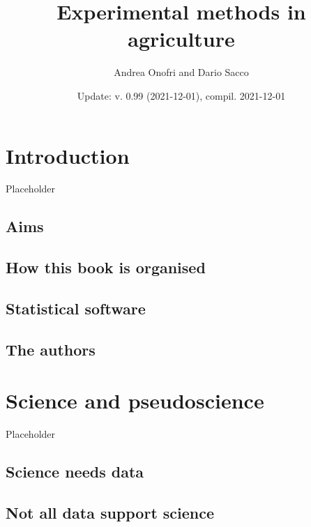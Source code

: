 \documentclass[a4paper,12pt,oneside]{book}
\author{Andrea Onofri and Dario Sacco}
\date{Update: v. 0.99 (2021-12-01), compil. 2021-12-01}
\title{Experimental methods in agriculture}
\subtitle{}
\begin{document}
\maketitle
\tableofcontents

\hypertarget{introduction}{%
\chapter*{Introduction}\label{introduction}}

Placeholder

\hypertarget{aims}{%
\section*{Aims}\label{aims}}

\hypertarget{how-this-book-is-organised}{%
\section*{How this book is organised}\label{how-this-book-is-organised}}

\hypertarget{statistical-software}{%
\section*{Statistical software}\label{statistical-software}}

\hypertarget{the-authors}{%
\section*{The authors}\label{the-authors}}

\hypertarget{science-and-pseudoscience}{%
\chapter{Science and pseudoscience}\label{science-and-pseudoscience}}

Placeholder

\hypertarget{science-needs-data}{%
\section{Science needs data}\label{science-needs-data}}

\hypertarget{not-all-data-support-science}{%
\section{Not all data support science}\label{not-all-data-support-science}}
\end{document}
